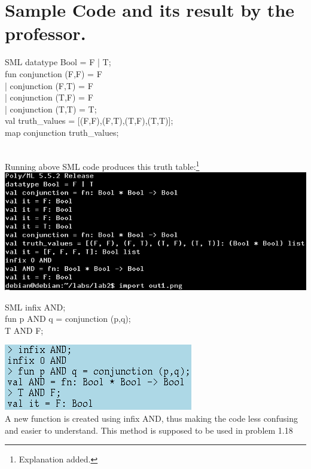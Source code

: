 \documentclass[11pt]{article}
\begin{document}
\section*{Sample Code and its result by the professor.}
\begin{GFT}{SML}
\+datatype Bool = F | T;\\
\+fun conjunction (F,F) = F\\
\+ | conjunction (F,T) = F\\
\+ | conjunction (T,F) = F\\
\+ | conjunction (T,T) = T;\\
\+val truth\_values = [(F,F),(F,T),(T,F),(T,T)];\\
\+map conjunction truth\_values;\\
\+\\
\end{GFT}
Running above SML code produces this truth table:\footnote{Explanation added.}\\
\includegraphics[scale= 0.6]{out1.png}
\begin{GFT}{SML}
\+infix AND;\\
\+fun p AND q = conjunction (p,q);\\
\+T AND F;\\
\end{GFT}
\includegraphics[scale = 0.6]{out2.png}\\
A new function is created using infix AND, thus making the code less confusing and easier to understand. This method is supposed to be used in problem 1.18\\
\clearpage
\end{document}
